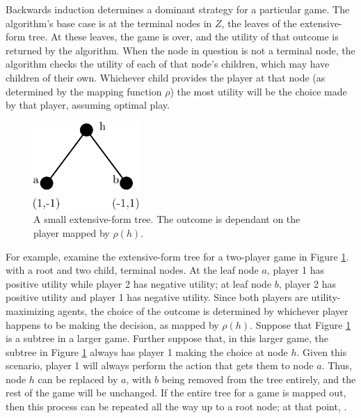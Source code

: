 Backwards induction determines a dominant strategy for a particular game. The algorithm's base case is at the terminal nodes in $Z$, the leaves of the extensive-form tree. At these leaves, the game is over, and the utility of that outcome is returned by the algorithm. When the node in question is not a terminal node, the algorithm checks the utility of each of that node's children, which may have children of their own. Whichever child provides the player at that node (as determined by the mapping function $\rho$) the most utility will be the choice made by that player, assuming optimal play.\\

\begin{figure}[H]
  \centering
  \includegraphics[width=4cm]{figures/ExampleBackwardInduction.png}
  \caption{A small extensive-form tree. The outcome is dependant on the player mapped by $\rho(h)$.}
  \label{fig:BackwardInduction}
\end{figure}
For example, examine the extensive-form tree for a two-player game in Figure \ref{fig:BackwardInduction}. with a root and two child, terminal nodes. At the leaf node $a$, player 1 has positive utility while player 2 has negative utility; at leaf node $b$, player 2 has positive utility and player 1 has negative utility. Since both players are utility-maximizing agents, the choice of the outcome is determined by whichever player happens to be making the decision, as mapped by $\rho(h)$. Suppose that Figure \ref{fig:BackwardInduction} is a subtree in a larger game. Further suppose that, in this larger game, the subtree in Figure \ref{fig:BackwardInduction} always has player 1 making the choice at node $h$. Given this scenario, player 1 will always perform the action that gets them to node $a$. Thus, node $h$ can be replaced by $a$, with $b$ being removed from the tree entirely, and the rest of the game will be unchanged. If the entire tree for a game is mapped out, then this process can be repeated all the way up to a root node; at that point, .